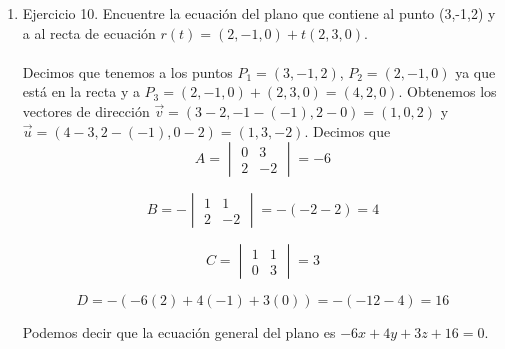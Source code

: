 \documentclass[10pt,letterpaper,fleqn]{article}
\begin{document}
\begin{enumerate}
        \item Ejercicio 10. Encuentre la ecuación del plano que contiene al punto (3,-1,2) y a al recta de ecuación $r(t)=(2,-1,0)+t(2,3,0)$. \\
        \\Decimos que tenemos a los puntos $P_1=(3,-1,2)$, $P_2=(2,-1,0)$ ya que está en la recta y a $P_3=(2,-1,0)+(2,3,0)=(4,2,0)$. Obtenemos
        los vectores de dirección $\overrightarrow{v}=(3-2,-1-(-1),2-0)=(1,0,2)$ y $\overrightarrow{u}=(4-3,2-(-1),0-2)=(1,3,-2)$.
        Decimos que
        $$ A =
        \begin{vmatrix}
          0 & 3 \\
          2 & -2
        \end{vmatrix}
        = -6
        $$

        $$ B = -
        \begin{vmatrix}
          1 & 1 \\
          2 & -2
        \end{vmatrix}
        = -(-2 -2) = 4
        $$

        $$ C =
        \begin{vmatrix}
          1 & 1 \\
          0 & 3
        \end{vmatrix}
        = 3
        $$

        $$ D = -(-6(2) + 4(-1) + 3(0))= -(-12-4) = 16$$

        Podemos decir que la ecuación general del plano es $-6x + 4y + 3z + 16 = 0$.


\end{enumerate}
\end{document}
